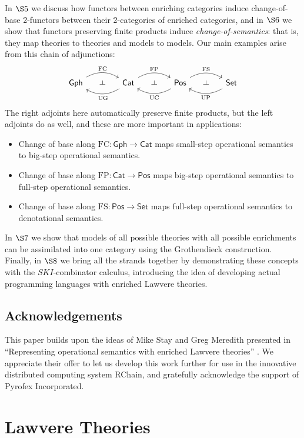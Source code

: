 \documentclass{amsart}
\theoremstyle{definition}
\def\ld{\rotatebox[origin=c]{-90}{$\dashv$}} %
\newcommand{\Gph}{\mathsf{Gph}}
\newcommand{\Set}{\mathsf{Set}}
\newcommand{\Cat}{\mathsf{Cat}}
\newcommand{\Pos}{\mathsf{Pos}}
\newcommand{\FC}{\mathrm{FC}}
\newcommand{\FP}{\mathrm{FP}}
\newcommand{\FS}{\mathrm{FS}}
\newcommand{\UC}{\mathrm{UC}}
\newcommand{\UP}{\mathrm{UP}}
\newcommand{\UG}{\mathrm{UG}}
\newcommand{\maps}{\colon}
\begin{document}
In $\S5$ we discuss how functors between enriching categories induce change-of-base 2-functors between their 2-categories of enriched categories, and in $\S6$ we show that functors preserving finite products induce \textit{change-of-semantics}: that is, they map theories to theories and models to models.   Our main examples arise from this chain of adjunctions:
\[\begin{tikzcd}[column sep=small]
\Gph \arrow[bend left,below]{rr}{\FC}
& \ld &
\arrow[bend left,above]{ll}{\UG} \Cat \arrow[bend left,below]{rr}{\FP}
& \ld &
\arrow[bend left,above]{ll}{\UC} \Pos \arrow[bend left,below]{rr}{\FS}
& \ld &
\Set \arrow[bend left,above]{ll}{\UP}
\end{tikzcd}\]
The right adjoints here automatically preserve finite products, but the left adjoints 
do as well, and these are more important in applications:
\begin{itemize}
\item 
Change of base along $\FC \maps \Gph \to \Cat$ maps small-step operational semantics to big-step operational semantics.
\item
Change of base along $\FP \maps \Cat \to \Pos$ maps big-step operational semantics to full-step operational semantics.
\item
Change of base along $\FS \maps \Pos \to \Set$ maps full-step operational semantics to
denotational semantics.
\end{itemize}

In $\S7$ we show that models of all possible theories with all possible enrichments can be assimilated into one category using the Grothendieck construction.  Finally, in $\S8$ we bring all the strands together by demonstrating these concepts with the $SKI$-combinator calculus, introducing the idea of developing actual programming languages with enriched Lawvere theories.

\subsection*{Acknowledgements}

This paper builds upon the ideas of Mike Stay and Greg Meredith presented in ``Representing operational semantics with enriched Lawvere theories''  \cite{roswelt}.  We appreciate their offer to let us develop this work further for use in the innovative distributed computing system RChain, and gratefully acknowledge the support of Pyrofex Incorporated. 

\section{Lawvere Theories}
\end{document}
